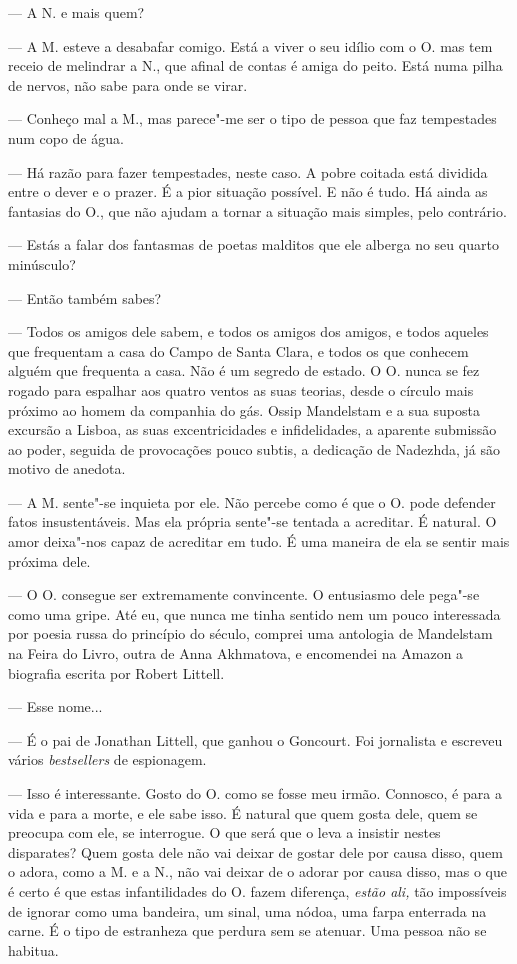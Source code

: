 --- A N. e mais quem?

--- A M. esteve a desabafar comigo. Está a viver o seu idílio com o O. mas
  tem receio de melindrar a N., que afinal de contas é amiga do peito.
  Está numa pilha de nervos, não sabe para onde se virar.

--- Conheço mal a M., mas parece"-me ser o tipo de pessoa que faz
  tempestades num copo de água.

--- Há razão para fazer tempestades, neste caso. A pobre coitada está
  dividida entre o dever e o prazer. É a pior situação possível. E não é
  tudo. Há ainda as fantasias do O., que não ajudam a tornar a situação
  mais simples, pelo contrário.

--- Estás a falar dos fantasmas de poetas malditos que ele alberga no seu
  quarto minúsculo?

--- Então também sabes?

--- Todos os amigos dele sabem, e todos os amigos dos amigos, e todos
  aqueles que frequentam a casa do Campo de Santa Clara, e todos os que
  conhecem alguém que frequenta a casa. Não é um segredo de estado. O O.
  nunca se fez rogado para espalhar aos quatro ventos as suas teorias,
  desde o círculo mais próximo ao homem da companhia do gás. Ossip Mandelstam e a sua suposta excursão a Lisboa, as suas excentricidades e
  infidelidades, a aparente submissão ao poder, seguida de provocações
  pouco subtis, a dedicação de Nadezhda, já são motivo de anedota.

--- A M. sente"-se inquieta por ele. Não percebe como é que o O. pode
  defender fatos insustentáveis. Mas ela própria sente"-se tentada a
  acreditar. É natural. O amor deixa"-nos capaz de acreditar em tudo. É
  uma maneira de ela se sentir
mais próxima dele.

--- O O. consegue ser extremamente convincente. O entusiasmo dele
  pega"-se como uma gripe. Até eu, que nunca me tinha sentido nem um
  pouco interessada por poesia russa do princípio do século, comprei uma
  antologia de Mandelstam na Feira do Livro, outra de Anna Akhmatova, e
  encomendei na Amazon a biografia escrita por Robert Littell.

--- Esse nome...

--- É o pai de Jonathan Littell, que ganhou o Goncourt.
Foi jornalista e escreveu vários \emph{bestsellers }de espionagem.

--- Isso é interessante. Gosto do O. como se fosse meu irmão. Connosco, é
  para a vida e para a morte, e ele sabe isso. É natural que quem gosta
  dele, quem se preocupa com ele, se interrogue. O que será que o leva a
  insistir nestes disparates? Quem gosta dele não vai deixar de gostar
  dele por causa disso, quem o adora, como a M. e a N., não vai deixar
  de o adorar por causa disso, mas o que é certo é que estas
  infantilidades do O. fazem diferença, \emph{estão ali, }tão impossíveis de ignorar como
uma bandeira, um sinal, uma nódoa, uma farpa enterrada na carne. É o
tipo de estranheza que perdura sem se atenuar. Uma pessoa não se
habitua.

